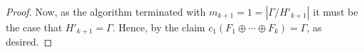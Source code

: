 \documentclass{article}
\newcommand{\beq}[1]{\begin{equation}\label{#1}}
\newcommand{\enq}[0]{\end{equation}}
\newtheorem*{claim*}{Claim}
\theoremstyle{definition}
\newenvironment{subproof}[1][\proofname]{%
  \renewcommand{\qedsymbol}{$\blacksquare$}%
  \begin{proof}[#1]%
}{%
  \end{proof}%
}
\begin{document}
\begin{proof}
Now, as the algorithm terminated with $m_{k+1}=1 = |\Gamma/H'_{k+1}|$ it must be the case that $H'_{k+1} = \Gamma$. Hence, by the claim $c_1(F_1\oplus\cdots \oplus F_{k}) = \Gamma$, as desired.










\end{proof}
\end{document}
